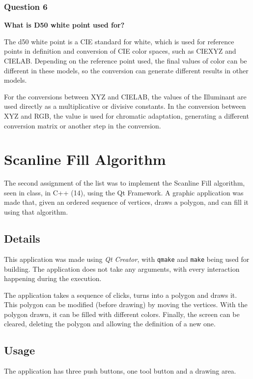 \documentclass[12pt]{article}
\begin{document}
\subsubsection*{Question 6}
{\bfseries What is D50 white point used for?}

The d50 white point is a CIE standard for white, which is used for reference points in definition and conversion of CIE color spaces, such as CIEXYZ and CIELAB. Depending on the reference point used, the final values of color can be different in these models, so the conversion can generate different results in other models.

For the conversions between XYZ and CIELAB, the values of the Illuminant are used directly as a multiplicative or divisive constants. In the conversion between XYZ and RGB, the value is used for chromatic adaptation, generating a different conversion matrix or another step in the conversion.

\section{Scanline Fill Algorithm}

The second assignment of the list was to implement the Scanline Fill algorithm, seen in class, in C++ (14), using the Qt Framework. A graphic application was made that,  given an ordered sequence of vertices, draws a polygon, and can fill it using that algorithm.

\subsection{Details}
This application was made using \textit{Qt Creator}, with \texttt{qmake} and \texttt{make} being used for building. The application does not take any arguments, with every interaction happening during the execution.

The application takes a sequence of clicks, turns into a polygon and draws it. This polygon can be modified (before drawing) by moving the vertices. With the polygon drawn, it can be filled with different colors. Finally, the screen can be cleared, deleting the polygon and allowing the definition of a new one.

\subsection{Usage}
The application has three push buttons, one tool button and a drawing area. 
\end{document}
